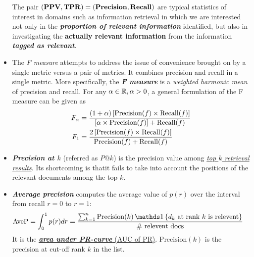 \documentclass[11pt]{article}
\begin{document}
\begin{itemize}
The pair $(\text{\textbf{PPV}}, \text{\textbf{TPR}}) = (\text{\textbf{Precision}}, \text{\textbf{Recall}})$ are typical statistics of interest in domains such as information retrieval in which we are interested not only in the \textit{\textbf{proportion of relevant information}} identified, but also in investigating the \textbf{actually relevant information} from the information \textbf{\emph{tagged as relevant}}. 

\item The \emph{F measure} attempts to address the issue of convenience brought on by a single metric versus a pair of metrics. It combines precision and recall in a single metric. More specifically, the \emph{\textbf{F measure}} is a \emph{weighted harmonic mean} of precision and recall. For any $\alpha \in {\mathbb R}, \alpha > 0$, a general formulation of the F measure can be given as
\begin{align}
F_{\alpha} &=\frac{(1 + \alpha)\left[\text{Precision}(f) \times \text{Recall}(f)\right]}{\left[\alpha \times \text{Precision}(f)\right]+ \text{Recall}(f)}\nonumber\\
F_{1} &=  \frac{2 \left[\text{Precision}(f) \times \text{Recall}(f)\right]}{\text{Precision}(f)+ \text{Recall}(f)}  \label{eqn: f_measure}
\end{align}


\item \textbf{\emph{Precision at $k$}} (referred as $P@k$) is the precision value among \underline{\emph{top $k$ retrieval results}}. Its shortcoming is thatit  fails to take into account the positions of the relevant documents among the top $k$.

\item  \textbf{\emph{Average precision}} computes the average value of $p(r)$ over the interval from recall $r=0$ to $r=1$:
\begin{align}
\text{AveP} &= \int_0^{1}p(r) dr = \frac{\sum_{k=1}^{n}\text{Precision}(k)\,\ind{d_k \text{ at rank }k \text{ is relevent}}}{\#\text{ relevent docs}} \label{eqn: average_precision}
\end{align} It is the \underline{\emph{\textbf{area under PR-curve}} (AUC of PR)}. $\text{Precision}(k)$ is the precision at cut-off rank $k$ in the list. 


\end{itemize}
\end{document}
